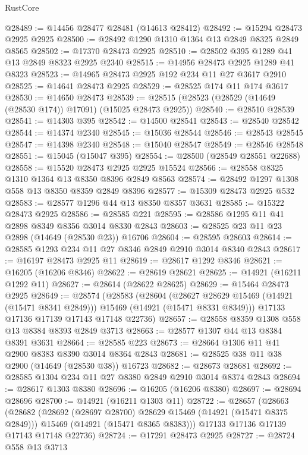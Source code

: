 \begin{lexlean}{RustCore}
\begin{coremodule}
@28489 := @14456 @28477 @28481 (@14613 @28412)
@28492 := @15294 @28473 @2925 @2925
@28500 := @28492 @1290 @1310 @1364 @13 @2849 @8325 @2849 @8565
@28502 := @17370 @28473 @2925
@28510 := @28502 @395 @1289 @41 @13 @2849 @8323 @2925 @2340
@28515 := @14956 @28473 @2925 @1289 @41 @8323
@28523 := @14965 @28473 @2925 @192 @234 @11 @27 @3617 @2910
@28525 := @14641 @28473 @2925
@28529 := @28525 @174 @11 @174 @3617
@28530 := @14650 @28473
@28539 := @28515 (@28523 (@28529 (@14649 (@28530 @174)) @17091) (@15025 @28473 @2925))
@28540 := @28510 @28539
@28541 := @14303 @395
@28542 := @14500 @28541
@28543 := @28540 @28542
@28544 := @14374 @2340
@28545 := @15036 @28544
@28546 := @28543 @28545
@28547 := @14398 @2340
@28548 := @15040 @28547
@28549 := @28546 @28548
@28551 := @15045 (@15047 @395)
@28554 := @28500 (@28549 @28551 @22688)
@28558 := @15520 @28473 @2925 @2925 @15524
@28566 := @28558 @8325 @1310 @1364 @13 @8350 @8396 @2849 @8563
@28574 := @28492 @1297 @1308 @558 @13 @8350 @8359 @2849 @8396
@28577 := @15309 @28473 @2925 @532
@28583 := @28577 @1296 @44 @13 @8350 @8357 @3631
@28585 := @15322 @28473 @2925
@28586 := @28585 @221
@28595 := @28586 @1295 @11 @41 @2898 @8349 @8356 @3014 @8330 @2843
@28603 := @28525 @23 @11 @23 @2898 (@14649 (@28530 @23)) @16706
@28604 := @28595 @28603
@28614 := @28585 @1293 @234 @11 @27 @8346 @2849 @2910 @3014 @8340 @2843
@28617 := @16197 @28473 @2925 @11
@28619 := @28617 @1292 @8346
@28621 := @16205 (@16206 @8346)
@28622 := @28619 @28621
@28625 := @14921 (@16211 @1292 @11)
@28627 := @28614 (@28622 @28625)
@28629 := @15464 @28473 @2925
@28649 := @28574
    (@28583
      (@28604
        (@28627 @28629 @15469 (@14921 (@15471 @8341 @2849)))
        @15469
        (@14921 (@15471 @8331 @8349)))
      @17133
      @17136
      @17139
      @17143
      @17148
      @22736)
@28657 := @28558 @8359 @1308 @558 @13 @8384 @8393 @2849 @3713
@28663 := @28577 @1307 @44 @13 @8384 @8391 @3631
@28664 := @28585 @223
@28673 := @28664 @1306 @11 @41 @2900 @8383 @8390 @3014 @8364 @2843
@28681 := @28525 @38 @11 @38 @2900 (@14649 (@28530 @38)) @16723
@28682 := @28673 @28681
@28692 := @28585 @1304 @234 @11 @27 @8380 @2849 @2910 @3014 @8374 @2843
@28694 := @28617 @1303 @8380
@28696 := @16205 (@16206 @8380)
@28697 := @28694 @28696
@28700 := @14921 (@16211 @1303 @11)
@28722 := @28657
    (@28663
      (@28682
        (@28692 (@28697 @28700) @28629 @15469 (@14921 (@15471 @8375 @2849)))
        @15469
        (@14921 (@15471 @8365 @8383)))
      @17133
      @17136
      @17139
      @17143
      @17148
      @22736)
@28724 := @17291 @28473 @2925
@28727 := @28724 @558 @13 @3713

\end{coremodule}
\end{lexlean}
